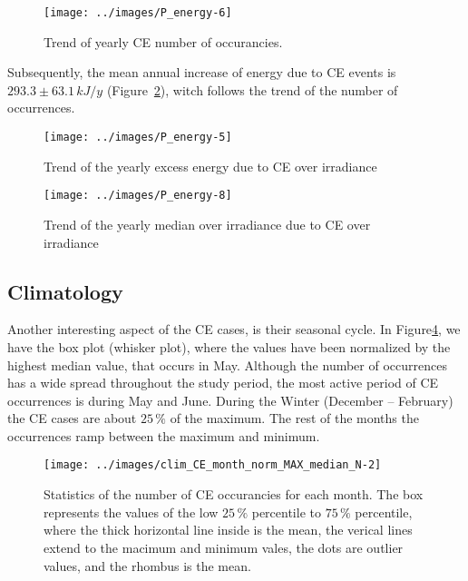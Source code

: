 \documentclass[preprint, 3p,
authoryear]{elsarticle} %
\begin{document}
\begin{figure}

{\centering \texttt{[image: ../images/P\_energy-6]} 

}

\caption{Trend of yearly CE number of occurancies.}\label{fig:P-energy-N}
\end{figure}

Subsequently, the mean annual increase of energy due to CE events is
\(293.3\pm 63.1\,kJ/y\) (Figure~\ref{fig:P-energy-sum}), witch follows
the trend of the number of occurrences.

\begin{figure}

{\centering \texttt{[image: ../images/P\_energy-5]} 

}

\caption{Trend of the yearly excess energy due to CE over irradiance}\label{fig:P-energy-sum}
\end{figure}

\begin{figure}

{\centering \texttt{[image: ../images/P\_energy-8]} 

}

\caption{Trend of the yearly median over irradiance due to CE over irradiance}\label{fig:P-energy-median}
\end{figure}

\hypertarget{climatology}{%
\subsection{Climatology}\label{climatology}}

Another interesting aspect of the CE cases, is their seasonal cycle. In
Figure\nobreakspace{}\ref{fig:relative-month-occurancies}, we have the
box plot (whisker plot), where the values have been normalized by the
highest median value, that occurs in May. Although the number of
occurrences has a wide spread throughout the study period, the most
active period of CE occurrences is during May and June. During the
Winter (December -- February) the CE cases are about \(25\,\%\) of the
maximum. The rest of the months the occurrences ramp between the maximum
and minimum.

\begin{figure}

{\centering \texttt{[image: ../images/clim\_CE\_month\_norm\_MAX\_median\_N-2]} 

}

\caption{Statistics of the number of CE occurancies for each month. The box represents the values of the low $25\,\%$ percentile to $75\,\%$ percentile, where the thick horizontal line inside is the mean, the verical lines extend to the macimum and minimum vales, the dots are outlier values, and the rhombus is the mean.}\label{fig:relative-month-occurancies}
\end{figure}
\end{document}

